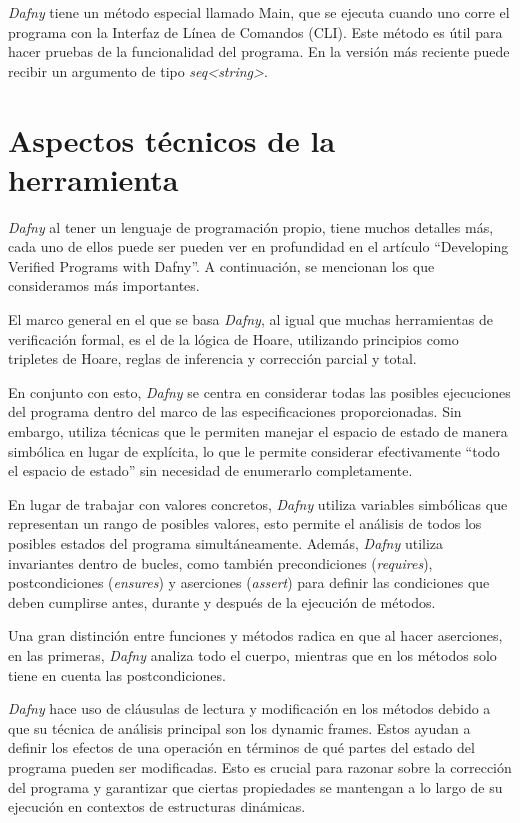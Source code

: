 \documentclass[runningheads]{llncs}
\begin{document}
\textit{Dafny} tiene un método especial llamado Main, que se ejecuta cuando uno corre el programa con la Interfaz de Línea de Comandos (CLI). Este método es útil para hacer pruebas de la funcionalidad del programa.
En la versión más reciente puede recibir un argumento de tipo \textit{seq<string>}.

\section{Aspectos técnicos de la herramienta}
\textit{Dafny} al tener un lenguaje de programación propio, tiene muchos detalles más, cada uno de ellos puede ser pueden ver en profundidad en el artículo 
``Developing Verified Programs with Dafny''\cite{10.1007/978-3-642-27705-4_7}.
A continuación, se mencionan los que consideramos más importantes.

El marco general en el que se basa \textit{Dafny}, al igual que muchas herramientas de verificación formal, es el de la lógica de Hoare,
utilizando principios como tripletes de Hoare, reglas de inferencia y corrección parcial y total.

En conjunto con esto, \textit{Dafny} se centra en considerar todas las posibles ejecuciones del programa dentro del marco de las especificaciones proporcionadas. 
Sin embargo, utiliza técnicas que le permiten manejar el espacio de estado de manera simbólica en lugar de explícita, 
lo que le permite considerar efectivamente ``todo el espacio de estado'' sin necesidad de enumerarlo completamente.

En lugar de trabajar con valores concretos, \textit{Dafny} utiliza variables simbólicas que representan un rango de posibles valores,
esto permite el análisis de todos los posibles estados del programa simultáneamente.
Además, \textit{Dafny} utiliza invariantes dentro de bucles, como también precondiciones (\textit{requires}), postcondiciones (\textit{ensures}) y aserciones (\textit{assert}) para definir las condiciones 
que deben cumplirse antes, durante y después de la ejecución de métodos.

Una gran distinción entre funciones y métodos radica en que al hacer aserciones, en las primeras, \textit{Dafny} analiza todo el cuerpo, mientras que en los métodos solo tiene en cuenta las postcondiciones. 

\textit{Dafny} hace uso de cláusulas de lectura y modificación en los métodos debido a que su técnica de análisis principal son los dynamic frames.
Estos ayudan a definir los efectos de una operación en términos de qué partes del estado del programa pueden ser modificadas. Esto es crucial para razonar sobre la corrección del programa y garantizar que ciertas propiedades se mantengan a lo largo de su ejecución en contextos de estructuras dinámicas.
\end{document}
